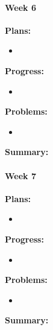 \paragraph{Week 6}
\begin{adjustwidth}{2.5em}{0pt}
    \vspace{-0.5cm}\textbf{Plans:}
    \vspace{-0.5cm}
    \begin{itemize}
        \item 
    \end{itemize} 
    \vspace{-0.3cm}\textbf{Progress:}
    \vspace{-0.5cm}
    \begin{itemize}
        \item  
    \end{itemize} 
    \vspace{-0.3cm}\textbf{Problems:}
    \vspace{-0.5cm}
    \begin{itemize}
        \item 
    \end{itemize}  
    \vspace{-0.3cm}\noindent\textbf{Summary:}\\
    \noindent 
\end{adjustwidth} 

\paragraph{Week 7}
\begin{adjustwidth}{2.5em}{0pt}
    \vspace{-0.5cm}\textbf{Plans:}
    \vspace{-0.5cm}
    \begin{itemize}
        \item 
    \end{itemize} 
    \vspace{-0.3cm}\textbf{Progress:}
    \vspace{-0.5cm}
    \begin{itemize}
        \item 
    \end{itemize} 
    \vspace{-0.3cm}\textbf{Problems:}
    \vspace{-0.5cm}
    \begin{itemize}
        \item 
    \end{itemize}  
    \vspace{-0.3cm}\noindent\textbf{Summary:}\\
    \noindent 
\end{adjustwidth} 

